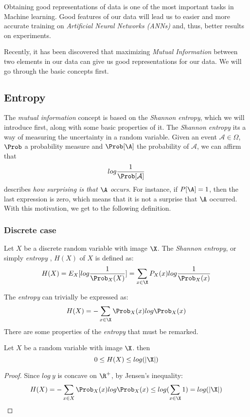 Obtaining good representations of data is one of the most important tasks in Machine learning. Good features of our data will lead us to easier and more accurate training on \emph{Artificial Neural Networks (ANNs)} and, thus, better results on experiments.

Recently, it has been discovered that maximizing \emph{Mutual Information} between two elements in our data can give us good representations for our data. We will go through the basic concepts first.


\subsection{Entropy}

The \emph{mutual information} concept is based on the \emph{Shannon entropy}, which we will introduce first, along with some basic properties of it. The \emph{Shannon entropy} its a way of measuring the uncertainty in a random variable. Given an event $\mathcal A \in \Omega$, $\Prob$ a probability measure and $\Prob[\A]$ the probability of $\mathcal A$, we can affirm that 
$$
log\frac{1}{\Prob[\mathcal A]}
$$
describes \emph{how surprising is that $\A$ occurs}. For instance, if $P[\A] = 1$, then the last expression is zero, which means that it is not a surprise that $\A$ occurred. With this motivation, we get to the following definition.

\subsubsection{Discrete case}

\begin{ndef}
Let $X$ be a discrete random variable with image $\X$. The \emph{Shannon entropy}, or simply \emph{entropy} , $H(X)$ of $X$ is defined as:
$$
H(X) = E_X[log\frac{1}{\Prob_X(X)}] =  \sum_{x \in \X} P_X(x) log\frac{1}{\Prob_X(x)}
$$
\end{ndef}
The \emph{entropy} can trivially be expressed as:
$$
H(X) = - \sum_{x \in \X}\Prob_X (x)log \Prob_X(x)
$$
There are some properties of the \emph{entropy} that must be remarked. 
\begin{nprop}
    Let $X$ be a random variable with image $\X$. then
    $$
0 \leq H(X) \leq log(|\X|)
    $$
\end{nprop}
\begin{proof}
    Since $log \ y$ is concave on $\R^+$, by Jensen's inequality:
    $$
    H(X) = - \sum_{x \in X}\Prob_X (x)log \Prob_X(x) \leq log(\sum_{x \in \X} 1) = log(|\X|)
    $$
\end{proof}


